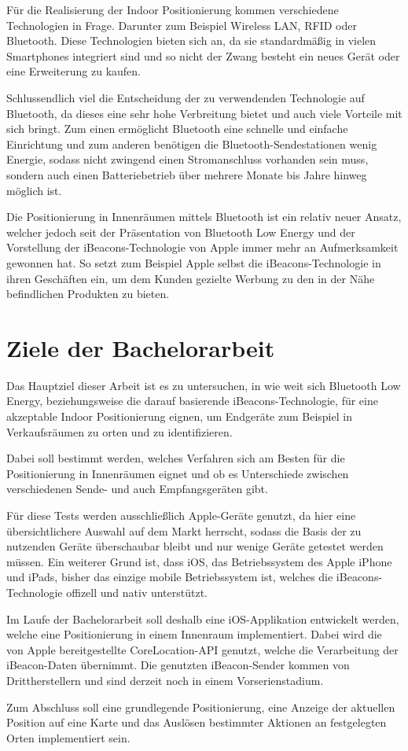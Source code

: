 Für die Realisierung der Indoor Positionierung kommen verschiedene Technologien in Frage. Darunter zum Beispiel Wireless LAN, RFID oder Bluetooth.
Diese Technologien bieten sich an, da sie standardmäßig in vielen Smartphones integriert sind und so nicht der Zwang besteht ein neues Gerät oder eine Erweiterung zu kaufen.


Schlussendlich viel die Entscheidung der zu verwendenden Technologie auf Bluetooth, da dieses eine sehr hohe Verbreitung bietet und auch viele Vorteile mit sich bringt. Zum einen ermöglicht Bluetooth eine schnelle und einfache Einrichtung und zum anderen benötigen die Bluetooth-Sendestationen wenig Energie, sodass nicht zwingend einen Stromanschluss vorhanden sein muss, sondern auch einen Batteriebetrieb über mehrere Monate bis Jahre hinweg möglich ist.

Die Positionierung in Innenräumen mittels Bluetooth ist ein relativ neuer Ansatz, welcher jedoch seit der Präsentation von Bluetooth Low Energy und der Vorstellung der iBeacons-Technologie von Apple immer mehr an Aufmerksamkeit gewonnen hat. So setzt zum Beispiel Apple selbst die iBeacons-Technologie in ihren Geschäften ein, um dem Kunden gezielte Werbung zu den in der Nähe befindlichen Produkten zu bieten.

\section{Ziele der Bachelorarbeit}
\label{sec:introduction:goal}


Das Hauptziel dieser Arbeit ist es zu untersuchen, in wie weit sich Bluetooth Low Energy, beziehungsweise die darauf basierende iBeacons-Technologie, für eine akzeptable Indoor Positionierung eignen, um Endgeräte zum Beispiel in Verkaufsräumen zu orten und zu identifizieren.

Dabei soll bestimmt werden, welches Verfahren sich am Besten für die Positionierung in Innenräumen eignet und ob es Unterschiede zwischen verschiedenen Sende- und auch Empfangsgeräten gibt.

Für diese Tests werden ausschließlich Apple-Geräte genutzt, da hier eine übersichtlichere Auswahl auf dem Markt herrscht, sodass die Basis der zu nutzenden Geräte überschaubar bleibt und nur wenige Geräte getestet werden müssen. Ein weiterer Grund ist, dass iOS, das Betriebssystem des Apple iPhone und iPads, bisher das einzige mobile Betriebssystem ist, welches die iBeacons-Technologie offizell und nativ unterstützt.

Im Laufe der Bachelorarbeit soll deshalb eine iOS-Applikation entwickelt werden, welche eine Positionierung in einem Innenraum implementiert. Dabei wird die von Apple bereitgestellte CoreLocation-API genutzt, welche die Verarbeitung der iBeacon-Daten übernimmt. Die genutzten iBeacon-Sender kommen von Drittherstellern und sind derzeit noch in einem Vorserienstadium. 

Zum Abschluss soll eine grundlegende Positionierung, eine Anzeige der aktuellen Position auf eine Karte und das Auslösen bestimmter Aktionen an festgelegten Orten implementiert sein.



